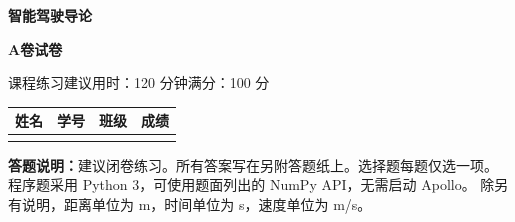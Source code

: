 \documentclass[UTF8,zihao=-4,fontset=fandol]{ctexart}
\newif\ifanswers
\providecommand{\Paper}{A}
\newcommand{\ExamCourse}{智能驾驶导论}
\newcommand{\ExamTitle}{\Paper 卷\ifanswers 参考答案\else 试卷\fi}
\newcommand{\ExamTerm}{课程练习}
\newcommand{\ExamDuration}{120 分钟}
\newcommand{\ExamTotalPoints}{100 分}
\begin{document}
\begin{center}
  {\bfseries \ExamCourse\par}
  \vspace{0.25em}
  {\bfseries \ExamTitle\par}
  \vspace{0.4em}
  \ExamTerm\qquad 建议用时：\ExamDuration\qquad 满分：\ExamTotalPoints
\end{center}
\ifanswers
\small
\textbf{评分说明：}每套独立计分。选择题每题仅一个正确选项。问答题按要点给分。
程序题允许逻辑等价的 Python 3 写法。相同错误不重复扣分。仅写样例输出且未实现算法，
程序题最多得该题结果分。数值结果允许正常浮点误差。\par
\else
\vspace{0.3em}
\begin{tabularx}{\textwidth}{|X|X|X|X|}
\hline 姓名 & 学号 & 班级 & 成绩\\\hline
\rule{0pt}{1.8em} & & &\\\hline
\end{tabularx}
\par\vspace{0.7em}
\textbf{答题说明：}建议闭卷练习。所有答案写在另附答题纸上。选择题每题仅选一项。
程序题采用 Python 3，可使用题面列出的 NumPy API，无需启动 Apollo。
除另有说明，距离单位为 m，时间单位为 s，速度单位为 m/s。\par
\fi

\end{document}
